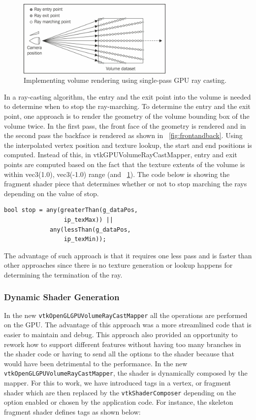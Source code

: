\begin{figure}
\centering
\includegraphics[width=3in]{raycasting.jpg}
\caption{Implementing volume rendering using single-pass GPU ray casting.}
\label{fig:raycasting}
\end{figure}

In a ray-casting algorithm, the entry and the exit point into the volume is needed to determine when to stop the ray-marching. To determine the entry and the exit point, one approach is to render the geometry of the volume bounding box of the volume twice. In the first pass, the front face of the geometry is rendered and in the second pass the backface is rendered as shown in ~\ref{fig:frontandback}. Using the interpolated vertex position and texture lookup, the start and end positions is computed. Instead of this, in vtkGPUVolumeRayCastMapper, entry and exit points are computed based on the fact that the texture extents of the volume is within vec3(1.0), vec3(-1.0) range (and ~\ref{fig:raycasting}). The code below is showing the fragment shader piece that determines whether or not to stop marching the rays depending on the value of stop.
 
 \begin{lstlisting}[breaklines=true]
 bool stop = any(greaterThan(g_dataPos, 
                 ip_texMax)) ||
             any(lessThan(g_dataPos, 
                 ip_texMin));
 \end{lstlisting}
 
 The advantage of such approach is that it requires one less pass and is faster than other approaches since there is no texture generation or lookup happens for determining the termination of the ray.
 
 
 \subsubsection{Dynamic Shader Generation}
 In the new \texttt{vtkOpenGLGPUVolumeRayCastMapper} all the operations are performed on the GPU. The advantage of this approach was a more streamlined code that is easier to maintain and debug. This approach also provided an opportunity to rework how to support different features without having too many branches in the shader code or having to send all the options to the shader because that would have been detrimental to the performance. In the new \texttt{vtkOpenGLGPUVolumeRayCastMapper}, the shader is dynamically composed by the mapper. For this to work, we have introduced tags in a vertex, or fragment shader which are then replaced by the \texttt{vtkShaderComposer} depending on the option enabled or chosen by the application code. For instance, the skeleton fragment shader defines tags as shown below:
 
